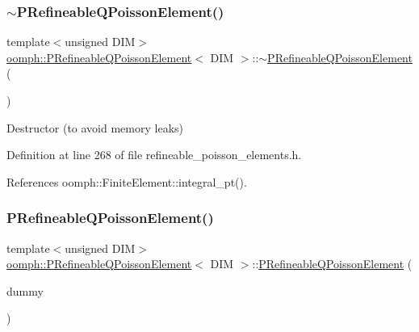 \subsubsection{\texorpdfstring{$\sim$\+P\+Refineable\+Q\+Poisson\+Element()}{~PRefineableQPoissonElement()}}
{\footnotesize\ttfamily template$<$unsigned D\+IM$>$ \\
\hyperlink{classoomph_1_1PRefineableQPoissonElement}{oomph\+::\+P\+Refineable\+Q\+Poisson\+Element}$<$ D\+IM $>$\+::$\sim$\hyperlink{classoomph_1_1PRefineableQPoissonElement}{P\+Refineable\+Q\+Poisson\+Element} (\begin{DoxyParamCaption}{ }\end{DoxyParamCaption})\hspace{0.3cm}{\ttfamily [inline]}}



Destructor (to avoid memory leaks) 



Definition at line 268 of file refineable\+\_\+poisson\+\_\+elements.\+h.



References oomph\+::\+Finite\+Element\+::integral\+\_\+pt().

\mbox{\label{classoomph_1_1PRefineableQPoissonElement_aa57cb66f7febfc2e02ed16799d3d2689}} 
\subsubsection{\texorpdfstring{P\+Refineable\+Q\+Poisson\+Element()}{PRefineableQPoissonElement()}\hspace{0.1cm}{\footnotesize\ttfamily [2/2]}}
{\footnotesize\ttfamily template$<$unsigned D\+IM$>$ \\
\hyperlink{classoomph_1_1PRefineableQPoissonElement}{oomph\+::\+P\+Refineable\+Q\+Poisson\+Element}$<$ D\+IM $>$\+::\hyperlink{classoomph_1_1PRefineableQPoissonElement}{P\+Refineable\+Q\+Poisson\+Element} (\begin{DoxyParamCaption}\item[{const \hyperlink{classoomph_1_1PRefineableQPoissonElement}{P\+Refineable\+Q\+Poisson\+Element}$<$ D\+IM $>$ \&}]{dummy }\end{DoxyParamCaption})\hspace{0.3cm}{\ttfamily [inline]}}



